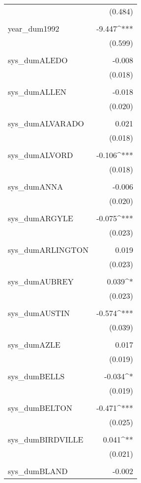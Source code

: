 \begin{table}[!htbp]
\begin{tabular}{@{\extracolsep{5pt}}lD{.}{.}{-3} }
  & (0.484) \\ 
  & \\ 
 year\_dum1992 & -9.447^{***} \\ 
  & (0.599) \\ 
  & \\ 
 sys\_dumALEDO & -0.008 \\ 
  & (0.018) \\ 
  & \\ 
 sys\_dumALLEN & -0.018 \\ 
  & (0.020) \\ 
  & \\ 
 sys\_dumALVARADO & 0.021 \\ 
  & (0.018) \\ 
  & \\ 
 sys\_dumALVORD & -0.106^{***} \\ 
  & (0.018) \\ 
  & \\ 
 sys\_dumANNA & -0.006 \\ 
  & (0.020) \\ 
  & \\ 
 sys\_dumARGYLE & -0.075^{***} \\ 
  & (0.023) \\ 
  & \\ 
 sys\_dumARLINGTON & 0.019 \\ 
  & (0.023) \\ 
  & \\ 
 sys\_dumAUBREY & 0.039^{*} \\ 
  & (0.023) \\ 
  & \\ 
 sys\_dumAUSTIN & -0.574^{***} \\ 
  & (0.039) \\ 
  & \\ 
 sys\_dumAZLE & 0.017 \\ 
  & (0.019) \\ 
  & \\ 
 sys\_dumBELLS & -0.034^{*} \\ 
  & (0.019) \\ 
  & \\ 
 sys\_dumBELTON & -0.471^{***} \\ 
  & (0.025) \\ 
  & \\ 
 sys\_dumBIRDVILLE & 0.041^{**} \\ 
  & (0.021) \\ 
  & \\ 
 sys\_dumBLAND & -0.002 \\ 

\end{tabular}
\end{table}
